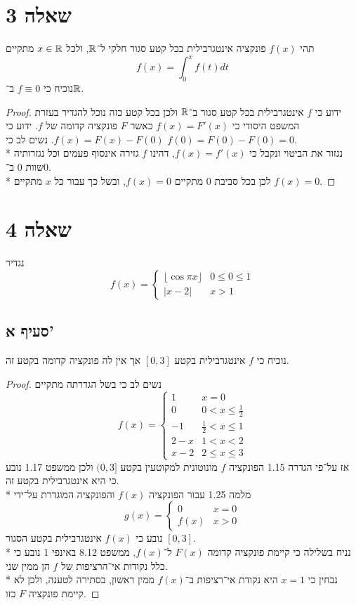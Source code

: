 \section{שאלה 3}
תהי $f(x)$ פונקציה אינטגרבילית בכל קטע סגור חלקי ל־$\mathbb{R}$, ולכל $x \in \mathbb{R}$ מתקיים
\[
	f(x) = \int_0^x f(t) dt
\]
נוכיח כי $f \equiv 0$ ב־$\mathbb{R}$.
\begin{proof}
	ידוע כי $f$ אינטגרבילית בכל קטע סגור ב־$\mathbb{R}$ ולכן בכל קטע כזה נוכל להגדיר בעזרת המשפט היסודי כי $f(x) = F'(x)$ כאשר $F$ פונקציה קדומה של $f$.
	ידוע כי $f(x) = F(x) - F(0)$. נשים לב כי $f(0) = F(0) - F(0) = 0$. \\*
	נגזור את הביטוי ונקבל כי $f(x) = f'(x)$, דהינו $f$ גזירה אינסוף פעמים וכל נגזרותיה שוות $0$ ב־$0$. \\*
	לכן בכל סביבת $0$ מתקיים $f(x) = 0$, ובשל כך עבור כל $x$ מתקיים $f(x) = 0$.
\end{proof}

\section{שאלה 4}
נגדיר
\[
	f(x) = \begin{cases}
		\lfloor \cos \pi x \rfloor & 0 \le 0 \le 1 \\
		\lvert x - 2 \rvert & x > 1
	\end{cases}
\]

\subsection{סעיף א'}
נוכיח כי $f$ אינטגרבילית בקטע $[0, 3]$ אך אין לה פונקציה קדומה בקטע זה.
\begin{proof}
	נשים לב כי בשל הגדרתה מתקיים
	\[
		f(x) = \begin{cases}
			1 & x = 0 \\
			0 & 0 < x \le \frac{1}{2} \\
			-1 & \frac{1}{2} < x \le 1 \\
			2 - x & 1 < x < 2 \\
			x - 2 & 2 \le x \le 3
		\end{cases}
	\]
	אז על־פי הגדרה 1.15 הפונקציה $f$ מונוטונית למקוטעין בקטע $(0, 3]$ ולכן ממשפט 1.17 נובע כי היא אינטגרבילית בקטע זה. \\* %
	מלמה 1.25 עבור הפונקציה $f(x)$ והפונקציה המוגדרת על־ידי
	\[
		g(x) = \begin{cases}
			0 & x = 0 \\
			f(x) & x > 0
		\end{cases}
	\]
	נובע כי $f(x)$ אינטגרבילית בקטע הסגור $[0, 3]$. \\*
	נניח בשלילה כי קיימת פונקציה קדומה $F(x)$ ל־$f(x)$, ממשפט 8.12 באינפי 1 נובע כי כלל נקודות אי־הרציפות של $f$ הן ממין שני. \\*
	נבחין כי $x = 1$ היא נקודת אי־רציפות ב־$f(x)$ ממין ראשון, בסתירה לטענה, ולכן לא קיימת פונקציה $F$ כזו.
\end{proof}

